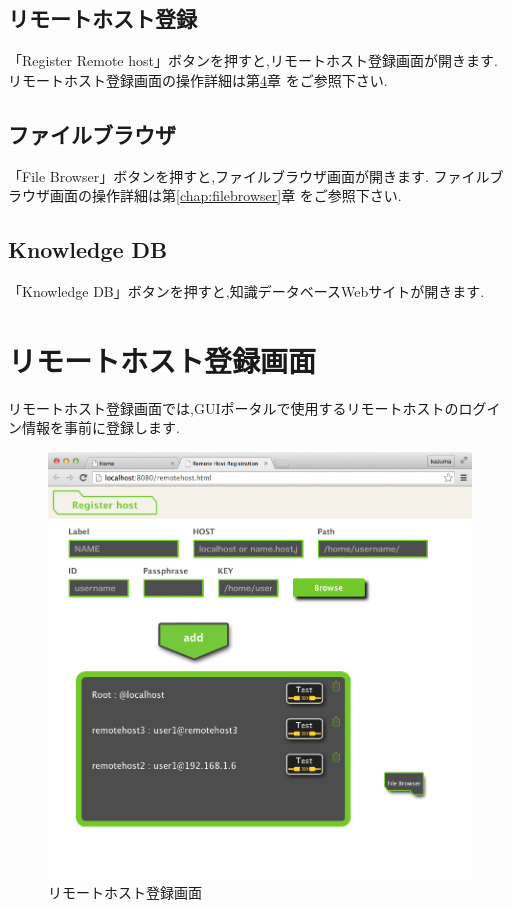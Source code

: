 \documentclass[a4paper,10pt,oneside]{jsbook}
\begin{document}
\section{リモートホスト登録}
「Register Remote host」ボタンを押すと,リモートホスト登録画面が開きます.
リモートホスト登録画面の操作詳細は第\ref{chap:remotehost}章 をご参照下さい.

\section{ファイルブラウザ}
「File Browser」ボタンを押すと,ファイルブラウザ画面が開きます.
ファイルブラウザ画面の操作詳細は第\ref{chap:filebrowser}章 をご参照下さい.

\section{Knowledge DB}
「Knowledge DB」ボタンを押すと,知識データベースWebサイトが開きます.


\chapter{リモートホスト登録画面}
\label{chap:remotehost}
リモートホスト登録画面では,GUIポータルで使用するリモートホストのログイン情報を事前に登録します.

\begin{figure}[htbp]
	\begin{center}
		\includegraphics[width=12.0cm]{image/remotehost_000.png}
	\end{center}
	\caption{リモートホスト登録画面}
	\label{fig:remotehost}
\end{figure}
\end{document}
